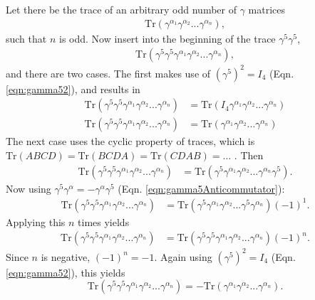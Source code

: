 Let there be the trace of an arbitrary odd number of $\gamma$ matrices
\begin{align*}
\text{Tr}(\gamma^{\alpha_1} \gamma^{\alpha_2} ... \gamma^{\alpha_n}),
\end{align*}
such that $n$ is odd. Now insert into the beginning of the trace $\gamma^5
\gamma^5$,
\begin{align*}
\text{Tr}(\gamma^5 \gamma^5 \gamma^{\alpha_1} \gamma^{\alpha_2} ... \gamma^{\alpha_n}),\end{align*}
and there are two cases. The first makes use of $(\gamma^5)^2=I_4$ (Eqn.
\ref{eqn:gamma52}), and
results in
\begin{align}\nonumber
\text{Tr}(\gamma^5 \gamma^5 \gamma^{\alpha_1} \gamma^{\alpha_2} ...
\gamma^{\alpha_n})&=\text{Tr}(I_4
\gamma^{\alpha_1} \gamma^{\alpha_2} ... \gamma^{\alpha_n})\\
\text{Tr}(\gamma^5 \gamma^5 \gamma^{\alpha_1} \gamma^{\alpha_2} ...
\gamma^{\alpha_n})&=\text{Tr}(\gamma^{\alpha_1} \gamma^{\alpha_2} ...
\gamma^{\alpha_n})
\label{eqn:traceOdd1}
\end{align}
The next case uses the cyclic property of traces, which is
$\text{Tr}(ABCD)=\text{Tr}(BCDA)=\text{Tr}(CDAB)=\ldots$ .
Then
\begin{align*}
\text{Tr}(\gamma^5 \gamma^5 \gamma^{\alpha_1} \gamma^{\alpha_2} ...
\gamma^{\alpha_n})&=\text{Tr}(\gamma^5
\gamma^{\alpha_1} \gamma^{\alpha_2} ... \gamma^{\alpha_n}\gamma^5).
\end{align*}
Now using $\gamma^5\gamma^\alpha = -\gamma^\alpha \gamma^5$ (Eqn.
\ref{eqn:gamma5Anticommutator}):
\begin{align*}
\text{Tr}(\gamma^5 \gamma^5 \gamma^{\alpha_1} \gamma^{\alpha_2} ...
\gamma^{\alpha_n})&=\text{Tr}(\gamma^5
\gamma^{\alpha_1} \gamma^{\alpha_2} ... \gamma^5 \gamma^{\alpha_n})(-1)^1.
\end{align*}
Applying this $n$ times yields
\begin{align*}
\text{Tr}(\gamma^5 \gamma^5 \gamma^{\alpha_1} \gamma^{\alpha_2} ...
\gamma^{\alpha_n})&=\text{Tr}(\gamma^5
\gamma^5 \gamma^{\alpha_1} \gamma^{\alpha_2} ... \gamma^{\alpha_n})(-1)^n.
\end{align*}
Since $n$ is negative, $(-1)^n=-1$. Again using $(\gamma^5)^2=I_4$ (Eqn.
\ref{eqn:gamma52}), this
yields
\begin{equation}\label{eqn:traceOdd2}
\text{Tr}(\gamma^5 \gamma^5 \gamma^{\alpha_1} \gamma^{\alpha_2} ...
\gamma^{\alpha_n})=-\text{Tr}(\gamma^{\alpha_1} \gamma^{\alpha_2} ...
\gamma^{\alpha_n}).
\end{equation}
